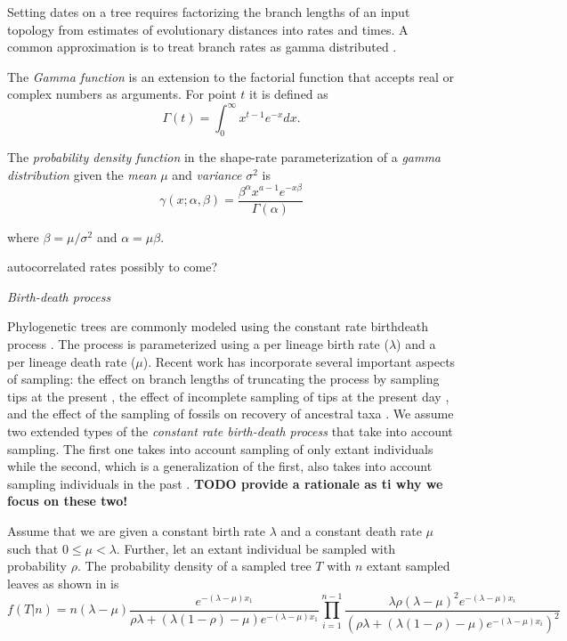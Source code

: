 \documentclass{llncs}
\newcommand{\ejmcomment}[1]{{\color{green} #1}}
\renewcommand{\subsection}[1]{%
\bigskip
\begin{center}
\begin{large}
\normalfont\itshape #1
\end{large}
\end{center}}
\begin{document}
Setting dates on a tree requires factorizing the branch lengths of an input topology
from estimates of evolutionary distances into rates and times. 
A common approximation is to treat branch rates as gamma distributed \citep{Kishino2001}.


The {\em Gamma function} is an extension to the factorial function that accepts
real or complex numbers as arguments. For point $t$ it is defined as
$$\Gamma(t) = \int_0^\infty x^{t-1} e^{-x} dx.$$

The {\em probability density function} in the shape-rate parameterization of a
{\em gamma distribution} given the {\em mean} $\mu$ and {\em variance} $\sigma^2$ 
is
$$ \gamma(x;\alpha,\beta) = \frac{\beta^{\alpha}x^{a-1}e^{-x\beta}}{\Gamma(\alpha)} $$

where $\beta = \mu / \sigma^2$ and $\alpha = \mu \beta$.

\ejmcomment{autocorrelated rates possibly to come?}

\subsection{Birth-death process}
Phylogenetic trees are commonly modeled using the constant rate birth\textendash death process \citep{Kendall1948}.
The process is parameterized using a per lineage birth rate ($\lambda$) and a per lineage death rate ($\mu$).
Recent work has incorporate several important aspects of sampling:
the effect on branch lengths of truncating the process by sampling tips at the present \citep{Gernhard2008},
the effect of incomplete sampling of tips at the present day \citep{Stadler2009}, and the effect of the sampling
of fossils on recovery of ancestral taxa \citep{Stadler2010}.
We assume two extended types of the {\em constant rate birth-death process}
that take into account sampling. The
first one takes into account sampling of only extant individuals
\citep{Stadler2009} while the second, which is a generalization of the first,
also takes into account sampling individuals in the past \citep{Stadler2010}.
{\bf TODO provide a rationale as ti why we focus on these two!} 

Assume that we are given a constant birth rate $\lambda$ and a constant death rate $\mu$ such that
$0 \leq \mu < \lambda$. Further, let an extant individual be sampled with
probability $\rho$.  The probability density of a sampled tree $T$ with $n$
extant sampled leaves as shown in \citep{Stadler2010} is 
%
%
$$f(T|n) = n(\lambda-\mu)\frac{e^{-(\lambda-\mu)x_1}}{\rho\lambda + (\lambda(1 -\rho)-\mu)e^{-(\lambda-\mu)x_1}}\prod_{i=1}^{n-1}
\frac{\lambda\rho(\lambda-\mu)^2e^{-(\lambda-\mu)x_i}}{(\rho\lambda + (\lambda(1-\rho)-\mu)e^{-(\lambda-\mu)x_i})^2}$$
%
%
\end{document}
